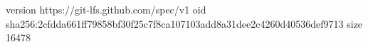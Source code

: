 version https://git-lfs.github.com/spec/v1
oid sha256:2cfdda661ff79858bf30f25c7f8ca107103add8a31dee2c4260d40536def9713
size 16478
